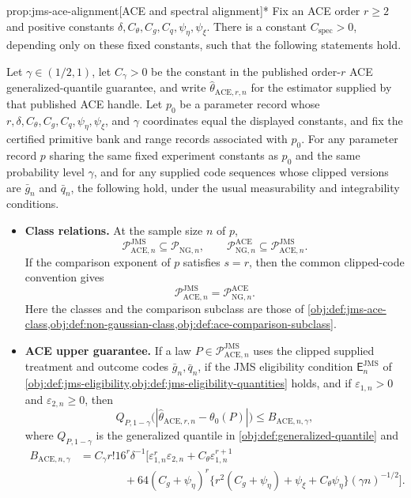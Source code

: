 \begin{propositionv}{prop:jms-ace-alignment}[ACE and spectral alignment]*
Fix an ACE order \(r\ge2\) and positive constants
\(\delta,C_{\theta},C_g,C_q,\psi_{\eta},\psi_{\xi}\).  There is a constant
\(C_{\mathrm{spec}}>0\), depending only on these fixed constants, such that
the following statements hold.

Let \(\gamma\in(1/2,1)\), let \(C_{\gamma}>0\) be the constant in the
published order-\(r\) ACE generalized-quantile guarantee, and write
\(\widehat\theta_{\mathrm{ACE},r,n}\) for the estimator supplied by that
published ACE handle.  Let \(p_0\) be a parameter record whose
\(r,\delta,C_{\theta},C_g,C_q,\psi_{\eta},\psi_{\xi}\), and \(\gamma\)
coordinates equal the displayed constants, and fix the certified primitive
bank and range records associated with \(p_0\).  For any parameter record
\(p\) sharing the same fixed experiment constants as \(p_0\) and the same
probability level \(\gamma\), and for any supplied code sequences whose clipped
versions are \(\bar g_n\) and \(\bar q_n\), the following hold, under the
usual measurability and integrability conditions.

\begin{itemize}
\item \textbf{Class relations.} At the sample size \(n\) of \(p\),
\[
 \mathcal P_{\mathrm{ACE},n}^{\mathrm{JMS}}
 \subseteq \mathcal P_{\mathrm{NG},n},
 \qquad
 \mathcal P_{\mathrm{NG},n}^{\mathrm{ACE}}
 \subseteq \mathcal P_{\mathrm{ACE},n}^{\mathrm{JMS}}.
\]
If the comparison exponent of \(p\) satisfies \(s=r\), then the common clipped-code convention gives
\[
 \mathcal P_{\mathrm{ACE},n}^{\mathrm{JMS}}
 =\mathcal P_{\mathrm{NG},n}^{\mathrm{ACE}}.
\]
Here the classes and the comparison subclass are those of
\cref{obj:def:jms-ace-class,obj:def:non-gaussian-class,obj:def:ace-comparison-subclass}.

\item \textbf{ACE upper guarantee.} If a law \(P\in\mathcal P_{\mathrm{ACE},n}^{\mathrm{JMS}}\)
uses the clipped supplied treatment and outcome codes \(\bar g_n,\bar q_n\),
if the JMS eligibility condition \(\mathsf E_n^{\mathrm{JMS}}\) of
\cref{obj:def:jms-eligibility,obj:def:jms-eligibility-quantities} holds,
and if \(\varepsilon_{1,n}>0\) and \(\varepsilon_{2,n}\ge0\), then
\[
 Q_{P,1-\gamma}
 \bigl(|\widehat\theta_{\mathrm{ACE},r,n}-\theta_0(P)|\bigr)
 \le B_{\mathrm{ACE},n,\gamma},
\]
where \(Q_{P,1-\gamma}\) is the generalized quantile in
\cref{obj:def:generalized-quantile} and
\[
\begin{aligned}
 B_{\mathrm{ACE},n,\gamma}
 &= C_{\gamma} r!16^r\delta^{-1}
 \Big[
   \varepsilon_{1,n}^r\varepsilon_{2,n}
   + C_{\theta}\varepsilon_{1,n}^{r+1}  \\
 &\qquad\qquad
   +64(C_g+\psi_{\eta})^r
   \{r^2(C_g+\psi_{\eta})+\psi_{\xi}+C_{\theta}\psi_{\eta}\}
   (\gamma n)^{-1/2}
 \Big].
\end{aligned}
\]


\end{itemize}
\end{propositionv}
